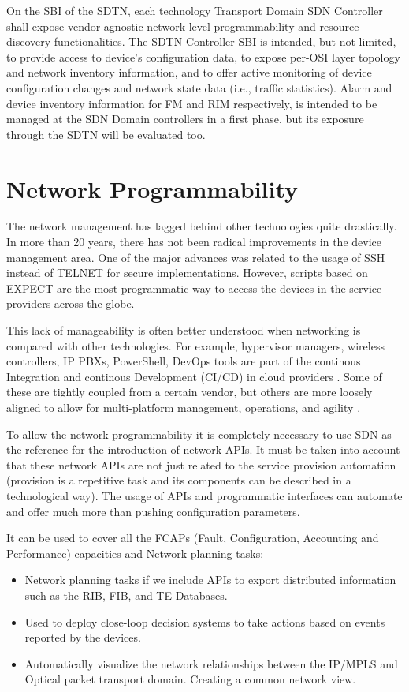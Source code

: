 \documentclass[a4paper,fleqn]{cas-dc}
\begin{document}
On the SBI of the SDTN, each technology Transport Domain SDN Controller shall expose vendor agnostic network level programmability and resource discovery functionalities. The SDTN Controller SBI is intended, but not limited, to provide access to device’s configuration data, to expose per-OSI layer topology and network inventory information, and to offer active monitoring of device configuration changes and network state data (i.e., traffic statistics). Alarm and device inventory information for FM and RIM respectively, is intended to be managed at the SDN Domain controllers in a first phase, but its exposure through the SDTN will be evaluated too.


\section{Network Programmability}
\label{section:net}

The network management has lagged behind other technologies quite drastically. In more than 20 years, there has not been radical improvements in the device management area. One of the major advances was related to the usage of SSH instead of TELNET for secure implementations. However, scripts based on EXPECT are the most programmatic way to access the devices in the service providers across the globe.

This lack of manageability is often better understood when networking is compared with other technologies. For example, hypervisor managers, wireless controllers, IP PBXs, PowerShell, DevOps tools are part of the continous Integration and continous Development (CI/CD) in cloud providers \cite{mittal2017cloud,demchenko2016zerotouch}. Some of these are tightly coupled from a certain vendor, but others are more loosely aligned to allow for multi-platform management, operations, and agility \cite{edelman2018network}.

To allow the network programmability it is completely necessary to use SDN as the reference for the introduction of network APIs. It must be taken into account that these network APIs are not just related to the service provision automation (provision is a repetitive task and its components can be described in a technological way). The usage of APIs and programmatic interfaces can automate and offer much more than pushing configuration parameters. 

It can be used to cover all the FCAPs (Fault, Configuration, Accounting and Performance) capacities and Network planning tasks:
\begin{itemize}
    \item Network planning tasks if we include APIs to export distributed information such as the RIB, FIB, and TE-Databases.
    \item Used to deploy close-loop decision systems to take actions based on events reported by the devices.
    \item Automatically visualize the network relationships between the IP/MPLS and Optical packet transport domain. Creating a common network view. 
\end{itemize}
\end{document}
